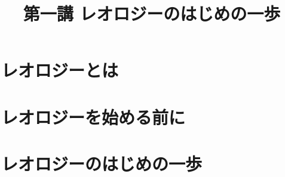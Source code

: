 \documentclass[uplatex,dvipdfmx,a4paper,11pt]{jsreport}
\title{第一講 レオロジーのはじめの一歩}
\author{}
\date{}
\begin{document}
\maketitle

\setcounter{tocdepth}{2}
\tableofcontents





\chapter{レオロジーとは}


\chapter{レオロジーを始める前に}


\chapter{レオロジーのはじめの一歩}




\printindex
\end{document}
